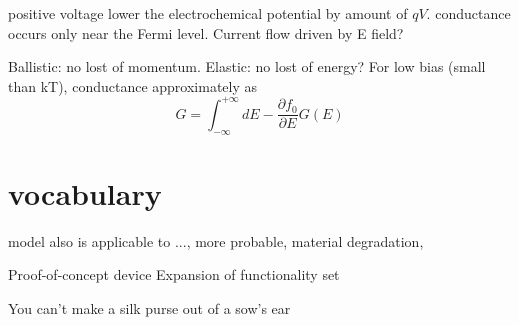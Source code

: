 positive voltage lower the electrochemical potential by amount of $qV$. conductance occurs only near the Fermi level. Current flow driven by E field? 

Ballistic: no lost of momentum. Elastic: no lost of energy?  
For low bias (small than kT), conductance approximately as
\[
G = \int_{-\infty}^{+\infty} dE -\frac{\partial f_0}{\partial E}G(E)
\]



\section{vocabulary}

model also is applicable to ..., more probable, material degradation, 

Proof-of-concept device
Expansion of functionality set 



You can't make a silk purse out of a sow's ear 


















